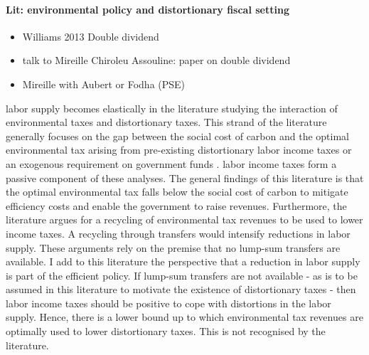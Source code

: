 \paragraph{Lit: environmental policy and distortionary fiscal setting}
\tr{}
\begin{itemize}
	\item Williams 2013 Double dividend 
	\item talk to Mireille Chiroleu Assouline: paper on double dividend
	\item Mireille with Aubert or Fodha (PSE)
\end{itemize}
labor supply becomes elastically in the literature studying the interaction of environmental taxes and distortionary taxes.  This strand of the literature generally focuses on the gap between the social cost of carbon and the optimal environmental tax arising from pre-existing distortionary labor income taxes or an exogenous requirement on government funds \citep{Bovenberg1997EnvironmentalGrowth,  Kaplow2012OPTIMALTAXATION, Jacobs2019RedistributionCurves, Barrage2019OptimalPolicy}. labor income taxes form a passive component of these analyses. 
The general findings of this literature is that the optimal environmental tax falls below the social cost of carbon to mitigate efficiency costs and enable the government to raise revenues. 
Furthermore, the literature argues for a recycling of environmental tax revenues to be used to lower income taxes. A recycling through transfers would intensify reductions in labor supply. These arguments rely on the premise that no lump-sum transfers are available. I add to this literature the perspective that a reduction in labor supply is part of the efficient policy. If lump-sum transfers are not available - as is to be assumed in this literature to motivate the existence of distortionary taxes - then labor income taxes should be positive to cope with distortions in the labor supply. Hence, there is a lower bound up to which environmental tax revenues are optimally used to lower distortionary taxes. This is not recognised by the literature. 

